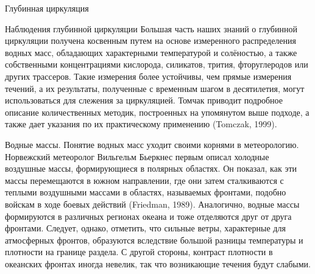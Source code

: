 \begin{chapter}{Глубинная циркуляция}
\begin{section}{Наблюдения глубинной циркуляции}
Большая часть наших знаний о глубинной циркуляции получена косвенным путем
на основе измеренного распределения водных масс, обладающих характерными
температурой и солёностью, а также собственными концентрациями кислорода,
силикатов, трития, фторуглеродов или других трассеров. Такие измерения более
устойчивы, чем прямые измерения течений, а их результаты, полученные 
с временным шагом в десятилетия, могут использоваться для слежения за
циркуляцией. Томчак приводит подробное описание количественных методик,
построенных на упомянутом выше подходе, а также дает указания по их 
практическому применению (Tomczak, 1999).
%

\begin{paragraph}{Водные массы.}
Понятие водных масс уходит своими корнями в метеорологию. Норвежский 
метеоролог Вильгельм Бьеркнес первым описал холодные воздушные массы, 
формирующиеся в полярных областях. Он показал, как эти массы перемещаются
в южном направлении, где они затем сталкиваются с теплыми воздушными массами
в областях, называемых фронтами, подобно войскам в ходе боевых 
действий (Friedman, 1989). Аналогично, водные массы формируются в различных
регионах океана и тоже отделяются друг от друга фронтами. Следует, однако, 
отметить, что сильные ветры, характерные для атмосферных фронтов, образуются 
вследствие большой разницы температуры и плотности на границе раздела. 
С другой стороны, контраст плотности в океанских фронтах иногда невелик, 
так что возникающие течения будут слабыми.
%


\end{paragraph}
\end{section}
\end{chapter}
